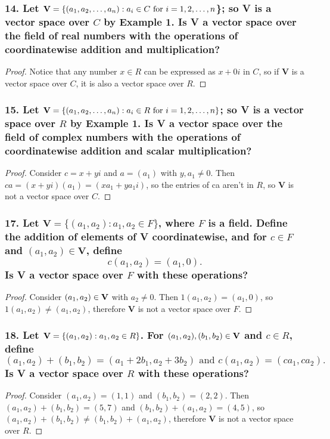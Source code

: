 \documentclass{article}
\begin{document}
\subsubsection*{14. Let $\textbf{\textup{V}} = \{(a_1, a_2, \dots, a_n): a_i \in C \text{ for } i=1,2,\dots,n$\}; so \textbf{V} is a vector space over $C$ by Example 1. Is \textbf{V} a vector space over the field of real numbers with the operations of coordinatewise addition and multiplication?}
\begin{proof}
	Notice that any number $x \in R$ can be expressed as $x + 0i$ in $C$, so if \textbf{V} is a vector space over $C$, it is also a vector space over $R$.
\end{proof}

\subsubsection*{15. Let $\textbf{\textup{V}} = \{(a_1, a_2, \dots, a_n): a_i \in R \text{ for } i=1,2,\dots,n\}$; so \textbf{V} is a vector space over $R$ by Example 1. Is \textbf{V} a vector space over the field of complex numbers with the operations of coordinatewise addition and scalar multiplication?}
\begin{proof}
	Consider $c = x + yi$ and $a = (a_1)$ with $y,a_1 \ne 0$. Then $ca = (x + yi)(a_1) = (xa_1 + ya_1i)$, so the entries of ca aren't in $R$, so \textbf{V} is not a vector space over $C$.
\end{proof}

\subsubsection*{17. Let $\textbf{V} = \{(a_1,a_2):a_1,a_2 \in F\}$, where $F$ is a field. Define the addition of elements of \textbf{V} coordinatewise, and for $c \in F$ and $(a_1,a_2) \in \textbf{V}$, define \[c(a_1, a_2) = (a_1, 0).\] Is \textbf{V} a vector space over $F$ with these operations?}
\begin{proof}
	Consider $(a_1,a_2) \in \textbf{\textup{V}}$ with $a_2 \ne 0$. Then $1(a_1, a_2) = (a_1, 0)$, so $1(a_1, a_2) \ne (a_1, a_2)$, therefore \textbf{V} is not a vector space over $F$.
\end{proof}

\subsubsection*{18. Let $\textbf{\textup{V}} = \{(a_1, a_2):a_1,a_2 \in R\}$. For $(a_1, a_2),(b_1, b_2) \in \textbf{\textup{V}}$ and $c \in R$, define \[(a_1, a_2) + (b_1, b_2) = (a_1 + 2b_1, a_2 + 3b_2) \text{ and } c(a_1, a_2) = (ca_1, ca_2).\] Is \textbf{V} a vector space over $R$ with these operations?}
\begin{proof}
	Consider $(a_1, a_2) = (1, 1)$ and $(b_1, b_2) = (2, 2)$. Then $(a_1, a_2) + (b_1, b_2) = (5, 7)$ and $(b_1, b_2) + (a_1, a_2) = (4, 5)$, so $(a_1, a_2) + (b_1, b_2) \ne (b_1, b_2) + (a_1, a_2)$, therefore \textbf{V} is not a vector space over $R$.
\end{proof}
\end{document}
